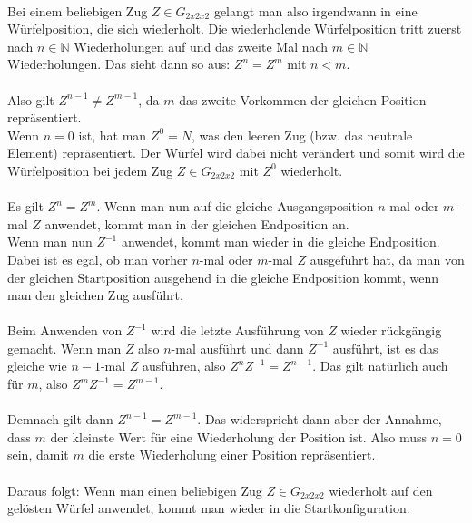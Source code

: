 \documentclass[12pt,a4paper, usenames, dvipsnames]{article}
\begin{document}
\\
Bei einem beliebigen Zug $Z \in G_{2x2x2}$ gelangt man also irgendwann in eine Würfelposition, die sich wiederholt. Die wiederholende Würfelposition tritt zuerst nach $n \in \mathbb{N}$ Wiederholungen auf und das zweite Mal nach $m \in \mathbb{N}$ Wiederholungen. Das sieht dann so aus: $Z^n=Z^m$ mit $n < m$. \\
\\
Also gilt $Z^{n-1} \neq Z^{m-1}$, da $m$ das zweite Vorkommen der gleichen Position repräsentiert. \\
Wenn $n=0$ ist, hat man $Z^0=N$, was den leeren Zug (bzw. das neutrale Element) repräsentiert. Der Würfel wird dabei nicht verändert und somit wird die Würfelposition bei jedem Zug $Z \in G_{2x2x2}$ mit $Z^0$ \glqq wiederholt\grqq . \\
\\
Es gilt $Z^n = Z^m$. Wenn man nun auf die gleiche Ausgangsposition $n$-mal oder $m$-mal $Z$ anwendet, kommt man in der gleichen Endposition an. \\
Wenn man nun $Z^{-1}$ anwendet, kommt man wieder in die gleiche Endposition. Dabei ist es egal, ob man vorher $n$-mal oder $m$-mal $Z$ ausgeführt hat, da man von der gleichen Startposition ausgehend in die gleiche Endposition kommt, wenn man den gleichen Zug ausführt. \\
\\
Beim Anwenden von $Z^{-1}$ wird die letzte Ausführung von $Z$ wieder rückgängig gemacht. Wenn man $Z$ also $n$-mal ausführt und dann $Z^{-1}$ ausführt, ist es das gleiche wie $n-1$-mal $Z$ ausführen, also $Z^nZ^{-1}=Z^{n-1}$. Das gilt natürlich auch für $m$, also $Z^mZ^{-1}=Z^{m-1}$. \\
\\
Demnach gilt dann $Z^{n-1}=Z^{m-1}$. Das widerspricht dann aber der Annahme, dass $m$ der kleinste Wert für eine Wiederholung der Position ist. Also muss $n=0$ sein, damit $m$ die erste Wiederholung einer Position repräsentiert. \\
\\
Daraus folgt: Wenn man einen beliebigen Zug $Z \in G_{2x2x2}$ wiederholt auf den gelösten Würfel anwendet, kommt man wieder in die Startkonfiguration.
 












\end{document}
